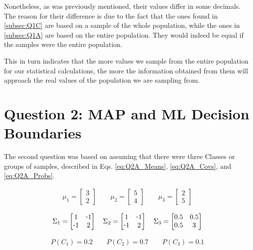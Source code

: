 \documentclass{article}
\def\-{\raisebox{.75pt}{-}}
\begin{document}
Nonetheless, as was previously mentioned, their values differ in some decimals. The reason for their difference is due to the fact that the ones found in \ref{subsec:Q1C} are based on a sample of the whole population, while the ones in \ref{subsec:Q1A} are based on the entire population. They would indeed be equal if the samples were the entire population.

This in turn indicates that the more values we sample from the entire population for our statistical calculations, the more the information obtained from them will approach the real values of the population we are sampling from.

\section{Question 2: MAP and ML Decision Boundaries}
The second question was based on assuming that there were three Classes or groups of samples, described in Eqs. \ref{eq:Q2A_Means}, \ref{eq:Q2A_Covs}, and \ref{eq:Q2A_Probs}.

\begin{gather}\label{eq:Q2A_Means}
\mu_1 = \begin{bmatrix}
3\\
2
\end{bmatrix}
\qquad
\mu_2 = \begin{bmatrix}
5\\
4
\end{bmatrix}
\qquad
\mu_3 = \begin{bmatrix}
2\\
5
\end{bmatrix}
\end{gather}

\begin{gather}\label{eq:Q2A_Covs}
\Sigma_1 = \begin{bmatrix}
1 & \-1\\
\-1 & 2
\end{bmatrix}
\quad
\Sigma_2 = \begin{bmatrix}
1 & \-1\\
\-1 & 2
\end{bmatrix}
\quad
\Sigma_3 = \begin{bmatrix}
0.5 & 0.5\\
0.5 & 3
\end{bmatrix}
\end{gather}

\begin{gather}\label{eq:Q2A_Probs}
P(C_1) = 0.2
\qquad 
P(C_2) = 0.7
\qquad 
P(C_3) = 0.1
\end{gather}
\end{document}
